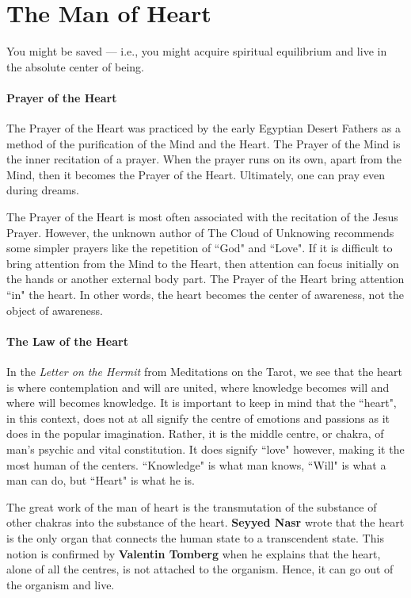 \section{The Man of Heart}

\begin{quotex}
You might be saved — i.e., you might acquire spiritual equilibrium and live in the absolute center of being. 

\end{quotex}
\paragraph{Prayer of the Heart}
The Prayer of the Heart was practiced by the early Egyptian Desert Fathers as a method of the purification of the Mind and the Heart. The Prayer of the Mind is the inner recitation of a prayer. When the prayer runs on its own, apart from the Mind, then it becomes the Prayer of the Heart. Ultimately, one can pray even during dreams.

The Prayer of the Heart is most often associated with the recitation of the Jesus Prayer. However, the unknown author of The Cloud of Unknowing recommends some simpler prayers like the repetition of ``God" and ``Love". If it is difficult to bring attention from the Mind to the Heart, then attention can focus initially on the hands or another external body part. The Prayer of the Heart bring attention ``in" the heart. In other words, the heart becomes the center of awareness, not the object of awareness.

\paragraph{The Law of the Heart}
In the \emph{Letter on the Hermit} from Meditations on the Tarot, we see that the heart is where contemplation and will are united, where knowledge becomes will and where will becomes knowledge. It is important to keep in mind that the ``heart", in this context, does not at all signify the centre of emotions and passions as it does in the popular imagination. Rather, it is the middle centre, or chakra, of man's psychic and vital constitution. It does signify ``love" however, making it the most human of the centers. ``Knowledge" is what man knows, ``Will" is what a man can do, but ``Heart" is what he is.

The great work of the man of heart is the transmutation of the substance of other chakras into the substance of the heart. \textbf{Seyyed Nasr} wrote that the heart is the only organ that connects the human state to a transcendent state. This notion is confirmed by \textbf{Valentin Tomberg} when he explains that the heart, alone of all the centres, is not attached to the organism. Hence, it can go out of the organism and live.

